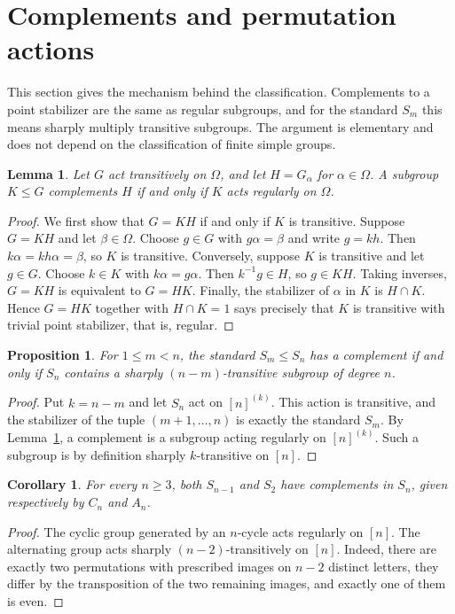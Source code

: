 \documentclass[12pt,letterpaper]{article}
\numberwithin{equation}{section}
\newtheorem{proposition}[theorem]{Proposition}
\newtheorem{lemma}[theorem]{Lemma}
\newtheorem{corollary}[theorem]{Corollary}
\theoremstyle{definition}
\begin{document}
\section{Complements and permutation actions}\label{sec:complements}
This section gives the mechanism behind the classification. Complements to a point stabilizer are the same as regular subgroups, and for the standard $S_m$ this means sharply multiply transitive subgroups. The argument is elementary and does not depend on the classification of finite simple groups.
\begin{lemma}\label{lem:regular}
Let $G$ act transitively on $\Omega$, and let $H=G_\alpha$ for $\alpha\in\Omega$. A subgroup $K\leq G$ complements $H$ if and only if $K$ acts regularly on $\Omega$.
\end{lemma}
\begin{proof}
We first show that $G=KH$ if and only if $K$ is transitive. Suppose $G=KH$ and let $\beta\in\Omega$. Choose $g\in G$ with $g\alpha=\beta$ and write $g=kh$. Then $k\alpha=kh\alpha=\beta$, so $K$ is transitive. Conversely, suppose $K$ is transitive and let $g\in G$. Choose $k\in K$ with $k\alpha=g\alpha$. Then $k^{-1}g\in H$, so $g\in KH$. Taking inverses, $G=KH$ is equivalent to $G=HK$. Finally, the stabilizer of $\alpha$ in $K$ is $H\cap K$. Hence $G=HK$ together with $H\cap K=1$ says precisely that $K$ is transitive with trivial point stabilizer, that is, regular.
\end{proof}
\begin{proposition}\label{prop:criterion}
For $1\leq m<n$, the standard $S_m\leq S_n$ has a complement if and only if $S_n$ contains a sharply $(n-m)$-transitive subgroup of degree $n$.
\end{proposition}
\begin{proof}
Put $k=n-m$ and let $S_n$ act on $[n]^{(k)}$. This action is transitive, and the stabilizer of the tuple $(m+1,\ldots,n)$ is exactly the standard $S_m$. By Lemma~\ref{lem:regular}, a complement is a subgroup acting regularly on $[n]^{(k)}$. Such a subgroup is by definition sharply $k$-transitive on $[n]$.
\end{proof}
\begin{corollary}\label{cor:universal}
For every $n\geq3$, both $S_{n-1}$ and $S_2$ have complements in $S_n$, given respectively by $C_n$ and $A_n$.
\end{corollary}
\begin{proof}
The cyclic group generated by an $n$-cycle acts regularly on $[n]$. The alternating group acts sharply $(n-2)$-transitively on $[n]$. Indeed, there are exactly two permutations with prescribed images on $n-2$ distinct letters, they differ by the transposition of the two remaining images, and exactly one of them is even.
\end{proof}
\end{document}
